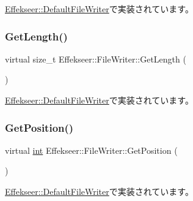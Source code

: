 \mbox{\hyperlink{class_effekseer_1_1_default_file_writer_a3b652725044e257665b48de729e79094}{Effekseer\+::\+Default\+File\+Writer}}で実装されています。

\mbox{\label{class_effekseer_1_1_file_writer_a6baf95dec7700d2c7a5e71c6c4f76724}} 
\subsubsection{\texorpdfstring{Get\+Length()}{GetLength()}}
{\footnotesize\ttfamily virtual size\+\_\+t Effekseer\+::\+File\+Writer\+::\+Get\+Length (\begin{DoxyParamCaption}{ }\end{DoxyParamCaption})\hspace{0.3cm}{\ttfamily [pure virtual]}}



\mbox{\hyperlink{class_effekseer_1_1_default_file_writer_a6745621cb9db4dc7d33d89de8aae435e}{Effekseer\+::\+Default\+File\+Writer}}で実装されています。

\mbox{\label{class_effekseer_1_1_file_writer_a656bbee191e65ccc63791d5c41c6e853}} 
\subsubsection{\texorpdfstring{Get\+Position()}{GetPosition()}}
{\footnotesize\ttfamily virtual \mbox{\hyperlink{namespace_effekseer_ace0abf7c2e6947e519ebe8b54cbcc30a}{int}} Effekseer\+::\+File\+Writer\+::\+Get\+Position (\begin{DoxyParamCaption}{ }\end{DoxyParamCaption})\hspace{0.3cm}{\ttfamily [pure virtual]}}



\mbox{\hyperlink{class_effekseer_1_1_default_file_writer_aa85409b51ae30ea259ce2d0f0bd30656}{Effekseer\+::\+Default\+File\+Writer}}で実装されています。

\mbox{\label{class_effekseer_1_1_file_writer_a9057c57df33d5112bc0d2c4e3e0c542d}} 
